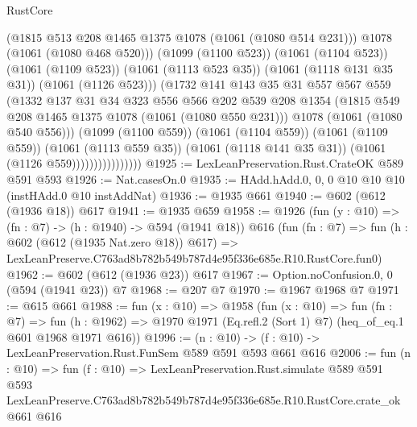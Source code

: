 \begin{lexlean}{RustCore}
\begin{coremodule}
                                  (@1815 @513 @208 @1465 @1375 @1078 (@1061 (@1080 @514 @231)))
                                  @1078
                                  (@1061 (@1080 @468 @520)))
                                (@1099 (@1100 @523))
                                (@1061 (@1104 @523))
                                (@1061 (@1109 @523))
                                (@1061 (@1113 @523 @35))
                                (@1061 (@1118 @131 @35 @31))
                                (@1061 (@1126 @523)))
                              (@1732
                                @141
                                @143
                                @35
                                @31
                                @557
                                @567
                                @559
                                (@1332
                                  @137
                                  @31
                                  @34
                                  @323
                                  @556
                                  @566
                                  @202
                                  @539
                                  @208
                                  @1354
                                  (@1815 @549 @208 @1465 @1375 @1078 (@1061 (@1080 @550 @231)))
                                  @1078
                                  (@1061 (@1080 @540 @556)))
                                (@1099 (@1100 @559))
                                (@1061 (@1104 @559))
                                (@1061 (@1109 @559))
                                (@1061 (@1113 @559 @35))
                                (@1061 (@1118 @141 @35 @31))
                                (@1061 (@1126 @559))))))))))))))))
@1925 := LexLeanPreservation.Rust.CrateOK @589 @591 @593
@1926 := Nat.casesOn.{0}
@1935 := HAdd.hAdd.{0, 0, 0} @10 @10 @10 (instHAdd.{0} @10 instAddNat)
@1936 := @1935 @661
@1940 := @602 (@612 (@1936 @18)) @617
@1941 := @1935 @659
@1958 := @1926
    (fun (y : @10) => (fn : @7) -> (h : @1940) -> @594 (@1941 @18))
    @616
    (fun (fn : @7) =>
    fun (h : @602 (@612 (@1935 Nat.zero @18)) @617) =>
    LexLeanPreserve.C763ad8b782b549b787d4e95f336e685e.R10.RustCore.fun0)
@1962 := @602 (@612 (@1936 @23)) @617
@1967 := Option.noConfusion.{0, 0} (@594 (@1941 @23)) @7
@1968 := @207 @7
@1970 := @1967 @1968 @7
@1971 := @615 @661
@1988 := fun (x : @10) =>
  @1958
    (fun (x : @10) =>
    fun (fn : @7) =>
    fun (h : @1962) => @1970 @1971 (Eq.refl.{2} (Sort 1) @7) (heq_of_eq.{1} @601 @1968 @1971 @616))
@1996 := (n : @10) -> (f : @10) -> LexLeanPreservation.Rust.FunSem @589 @591 @593 @661 @616
@2006 := fun (n : @10) =>
  fun (f : @10) =>
  LexLeanPreservation.Rust.simulate
    @589
    @591
    @593
    LexLeanPreserve.C763ad8b782b549b787d4e95f336e685e.R10.RustCore.crate_ok
    @661
    @616
\end{coremodule}
\end{lexlean}

